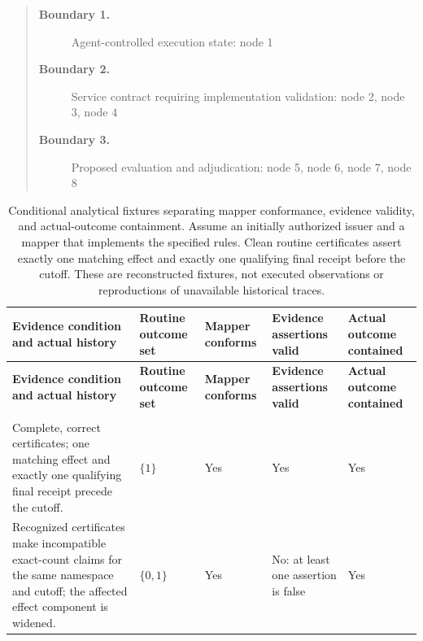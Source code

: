 \documentclass[11pt]{article}
\begin{document}
\begin{quote}
\begin{description}
\item[\textbf{Boundary 1.}] Agent-controlled execution state: node 1
\item[\textbf{Boundary 2.}] Service contract requiring implementation validation: node 2, node 3, node 4
\item[\textbf{Boundary 3.}] Proposed evaluation and adjudication: node 5, node 6, node 7, node 8
\end{description}
\par{}
\end{quote}
\begin{landscape}
\small
\begin{longtable}{@{}>{\raggedright\arraybackslash}p{}>{\raggedright\arraybackslash}p{}>{\raggedright\arraybackslash}p{}>{\raggedright\arraybackslash}p{}>{\raggedright\arraybackslash}p{}@{}}
\caption{Conditional analytical fixtures separating mapper conformance, evidence validity, and actual-outcome containment. Assume an initially authorized issuer and a mapper that implements the specified rules. Clean routine certificates assert exactly one matching effect and exactly one qualifying final receipt before the cutoff. These are reconstructed fixtures, not executed observations or reproductions of unavailable historical traces.}\\
\toprule
\textbf{Evidence condition and actual history} & \textbf{Routine outcome set} & \textbf{Mapper conforms} & \textbf{Evidence assertions valid} & \textbf{Actual outcome contained}\\
\midrule
\endfirsthead
\toprule
\textbf{Evidence condition and actual history} & \textbf{Routine outcome set} & \textbf{Mapper conforms} & \textbf{Evidence assertions valid} & \textbf{Actual outcome contained}\\
\midrule
\endhead
\midrule
\multicolumn{5}{r}{\footnotesize Continued on next page}\\
\endfoot
\bottomrule
\endlastfoot
Complete, correct certificates; one matching effect and exactly one qualifying final receipt precede the cutoff. & $\{1\}$ & Yes & Yes & Yes\\
Recognized certificates make incompatible exact-count claims for the same namespace and cutoff; the affected effect component is widened. & $\{0,1\}$ & Yes & No: at least one assertion is false & Yes\\

\end{longtable}
\end{landscape}
\end{document}
